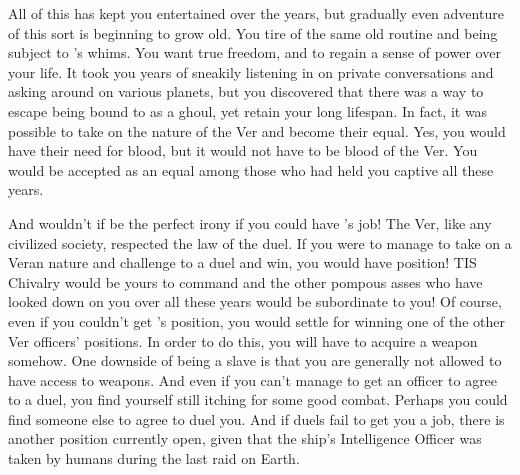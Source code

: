 \documentclass[char]{guildcamp4}
\begin{document}
All of this has kept you entertained over the years, but gradually even adventure of this sort is beginning to grow old. You tire of the same old routine and being subject to \cVone{}'s whims. You want true freedom, and to regain a sense of power over your life. It took you years of sneakily listening in on private conversations and asking around on various planets, but you discovered that there was a way to escape being bound to \cVone{} as a ghoul, yet retain your long lifespan. In fact, it was possible to take on the nature of the Ver and become their equal. Yes, you would have their need for blood, but it would not have to be blood of the Ver. You would be accepted as an equal among those who had held you captive all these years.

And wouldn't if be the perfect irony if you could have \cVone{}'s job! The Ver, like any civilized society, respected the law of the duel. If you were to manage to take on a Veran nature and challenge \cVone{\them} to a duel and win, you would have \cVone{\their} position! TIS Chivalry would be yours to command and the other pompous asses who have looked down on you over all these years would be subordinate to you! Of course, even if you couldn't get \cVone{}'s position, you would settle for winning one of the other Ver officers' positions. In order to do this, you will have to acquire a weapon somehow. One downside of being a slave is that you are generally not allowed to have access to weapons. And even if you can't manage to get an officer to agree to a duel, you find yourself still itching for some good combat. Perhaps you could find someone else to agree to duel you. And if duels fail to get you a job, there is another position currently open, given that the ship's Intelligence Officer was taken by humans during the last raid on Earth.
\end{document}
